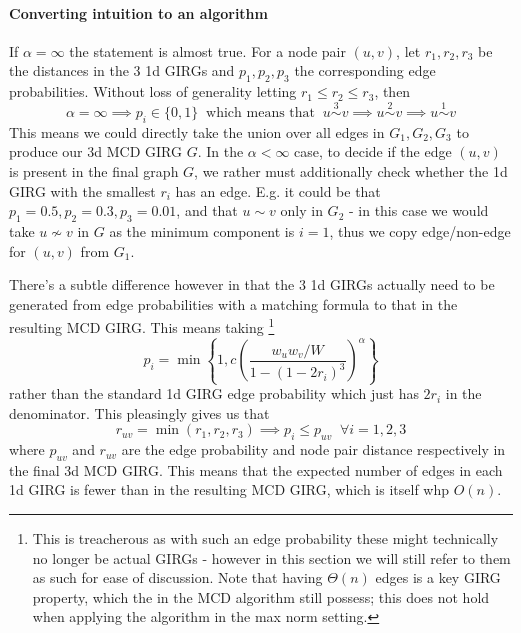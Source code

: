 \paragraph{Converting intuition to an algorithm}
If $\alpha=\infty$ the  statement is almost true.
For a node pair $(u,v)$, let $r_1, r_2, r_3$ be the distances in the $3$ 1d GIRGs and $p_1, p_2, p_3$ the corresponding edge probabilities. Without loss of generality letting $r_1 \leq r_2 \leq r_3$, then
\begin{equation}
    \alpha = \infty \implies p_i \in \{0, 1\} \;\; \text{which means that} \;\; u \stackrel{3}{\sim} v \implies u \stackrel{2}{\sim} v \implies u \stackrel{1}{\sim} v
\end{equation}
This means we could directly take the union over all edges in $G_1, G_2, G_3$ to produce our 3d MCD GIRG $G$.
In the $\alpha < \infty$ case, to decide if the edge $(u,v)$ is present in the final graph $G$, we rather must additionally check whether the 1d GIRG with the smallest $r_i$ has an edge. E.g. it could be that $p_1 = 0.5, p_2 = 0.3, p_3 = 0.01$, and that $u \sim v$ only in $G_2$ - in this case we would take $u \not \sim v$ in $G$ as the minimum component is $i=1$, thus we copy edge/non-edge for $(u, v)$ from $G_1$. 

There's a subtle difference however in that the $3$ 1d GIRGs actually need to be generated from edge probabilities with a matching formula to that in the resulting MCD GIRG. This means taking
\footnote{This is treacherous as with such an edge probability these  might technically no longer be actual GIRGs - however in this section we will still refer to them as such for ease of discussion. Note that having $\Theta(n)$ edges is a key GIRG property, which the  in the MCD algorithm still possess; this does not hold when applying the algorithm in the max norm setting.}
\begin{equation}
    p_i = \min \left \{
        1, c \left ( 
            \frac{w_u w_v / W}{1 - (1 - 2 r_i)^3}
        \right )^\alpha    
    \right \}
\end{equation}
rather than the standard 1d GIRG edge probability which just has $2 r_i$ in the denominator. 
This pleasingly gives us that
\begin{equation}
    r_{uv} = \min(r_1, r_2, r_3) \implies p_i \leq p_{uv} \;\; \forall i=1,2,3
\end{equation}
where $p_{uv}$ and $r_{uv}$ are the edge probability and node pair distance respectively in the final 3d MCD GIRG. This means that the expected number of edges in each 1d GIRG is fewer than in the resulting MCD GIRG, which is itself whp $O(n)$.

